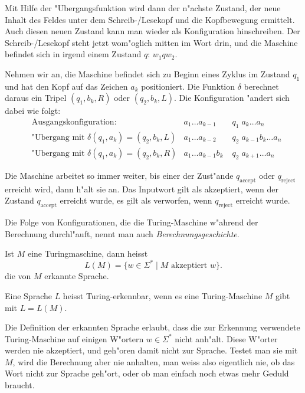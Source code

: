 Mit Hilfe der "Ubergangsfunktion wird dann der n"achste Zustand,
der neue Inhalt des Feldes unter dem Schreib-/Lesekopf und die
Kopfbewegung ermittelt. Auch diesen neuen Zustand kann man wieder
als Konfiguration hinschreiben. Der Schreib-/Lesekopf steht
jetzt wom"oglich mitten im Wort drin, und die Maschine befindet
sich in irgend einem Zustand $q$: $w_1qw_2$.

Nehmen wir an, die Maschine befindet sich zu Beginn eines Zyklus im
Zustand $q_1$ und hat den Kopf auf das Zeichen $a_k$ positioniert.
Die Funktion $\delta$ berechnet daraus ein Tripel $(q_1,b_k,R)$
oder $(q_2,b_k,L)$. Die Konfiguration "andert sich dabei wie
folgt:
\begin{align*}
&\text{Ausgangskonfiguration:}&a_1\dots a_{k-1}&\;q_1\;a_k\dots a_n\\
&\text{"Ubergang mit } \delta(q_1,a_k)=(q_2,b_k,L)&a_1\dots a_{k-2}&\;q_2\;a_{k-1}b_k\dots a_n\\
&\text{"Ubergang mit } \delta(q_1,a_k)=(q_2,b_k,R)&a_1\dots a_{k-1}b_k&\;q_2\;a_{k+1}\dots a_n
\end{align*}

Die Maschine arbeitet so immer weiter, bis einer der Zust"ande $q_{\text{accept}}$
oder $q_{\text{reject}}$ erreicht wird, dann h"alt sie an.
Das Inputwort gilt als akzeptiert, wenn der Zustand $q_{\text{accept}}$
erreicht wurde, es gilt als verworfen, wenn $q_{\text{reject}}$ erreicht
wurde.

Die Folge von Konfigurationen, die die Turing-Maschine
w"ahrend der Berechnung durchl"auft, nennt man auch
{\em Berechnungsgeschichte}.

\begin{definition}
Ist $M$ eine Turingmaschine, dann heisst
\[
L(M)=\{w\in\Sigma^*\;|\;\text{$M$ akzeptiert $w$}\}.
\]
die von $M$ erkannte Sprache.
\end{definition}

\begin{definition}
Eine Sprache $L$ heisst Turing-erkennbar, wenn es eine Turing-Maschine
$M$ gibt mit $L=L(M)$.
\end{definition}

Die Definition der erkannten Sprache erlaubt, dass die zur Erkennung
verwendete Turing-Maschine auf einigen W"ortern $w\in\Sigma^*$ nicht
anh"alt. Diese W"orter werden nie akzeptiert, und geh"oren
damit nicht zur Sprache. Testet man sie mit $M$, wird die Berechnung
aber nie anhalten, man weiss also eigentlich nie, ob das Wort
nicht zur Sprache geh"ort, oder ob man einfach noch etwas mehr
Geduld braucht.

